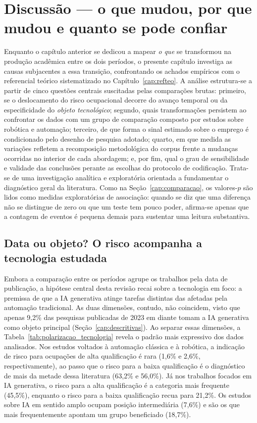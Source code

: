 \chapter{Discussão --- o que mudou, por que mudou e quanto se pode confiar}\label{cap:discussao}

Enquanto o capítulo anterior se dedicou a mapear \emph{o que} se transformou na produção acadêmica entre os dois períodos, o presente capítulo investiga as causas subjacentes a essa transição, confrontando os achados empíricos com o referencial teórico sistematizado no Capítulo~\ref{cap:refteo}. A análise estrutura-se a partir de cinco questões centrais suscitadas pelas comparações brutas: primeiro, se o deslocamento do risco ocupacional decorre do avanço temporal ou da especificidade do \emph{objeto tecnológico}; segundo, quais transformações persistem ao confrontar os dados com um grupo de comparação composto por estudos sobre robótica e automação; terceiro, de que forma o sinal estimado sobre o emprego é condicionado pelo desenho de pesquisa adotado; quarto, em que medida as variações refletem a recomposição metodológica do corpus frente a mudanças ocorridas no interior de cada abordagem; e, por fim, qual o grau de sensibilidade e validade das conclusões perante as escolhas do protocolo de codificação. Trata-se de uma investigação analítica e exploratória orientada a fundamentar o diagnóstico geral da literatura. Como na Seção~\ref{cap:comparacao}, os valores-$p$ são lidos como medidas exploratórias de associação: quando se diz que uma diferença não se distingue de zero ou que um teste tem pouco poder, afirma-se apenas que a contagem de eventos é pequena demais para sustentar uma leitura substantiva.

\section{Data ou objeto? O risco acompanha a tecnologia estudada}

Embora a comparação entre os períodos agrupe os trabalhos pela data de publicação, a hipótese central desta revisão recai sobre a tecnologia em foco: a premissa de que a IA generativa atinge tarefas distintas das afetadas pela automação tradicional. As duas dimensões, contudo, não coincidem, visto que apenas 9,2\% das pesquisas publicadas de 2023 em diante tomam a IA generativa como objeto principal (Seção~\ref{cap:descritivas}). Ao separar essas dimensões, a Tabela~\ref{tab:polarizacao_tecnologia} revela o padrão mais expressivo dos dados analisados. Nos estudos voltados à automação clássica e à robótica, a indicação de risco para ocupações de alta qualificação é rara (1,6\% e 2,6\%, respectivamente), ao passo que o risco para a baixa qualificação é o diagnóstico de mais da metade dessa literatura (63,2\% e 56,0\%). Já nos trabalhos focados em IA generativa, o risco para a alta qualificação é a categoria mais frequente (45,5\%), enquanto o risco para a baixa qualificação recua para 21,2\%. Os estudos sobre IA em sentido amplo ocupam posição intermediária (7,6\%) e são os que mais frequentemente apontam um grupo beneficiado (18,7\%).

